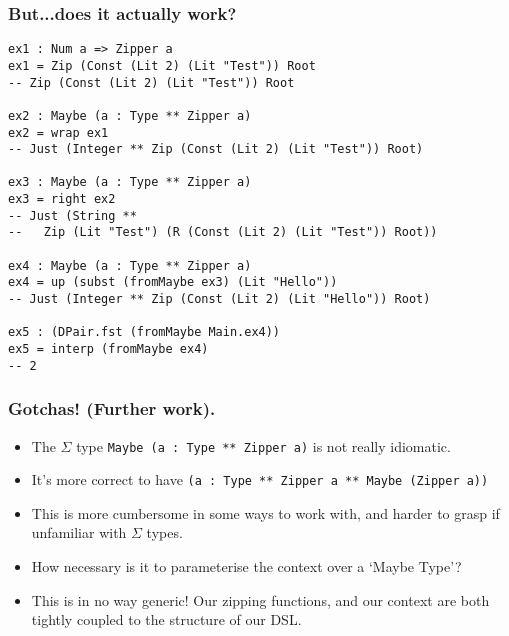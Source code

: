 \documentclass{beamer}
\begin{document}

\begin{frame}[fragile]
  \frametitle{But...does it actually work?}
  \begin{verbatim}
ex1 : Num a => Zipper a
ex1 = Zip (Const (Lit 2) (Lit "Test")) Root
-- Zip (Const (Lit 2) (Lit "Test")) Root

ex2 : Maybe (a : Type ** Zipper a)
ex2 = wrap ex1
-- Just (Integer ** Zip (Const (Lit 2) (Lit "Test")) Root)

ex3 : Maybe (a : Type ** Zipper a)
ex3 = right ex2
-- Just (String ** 
--   Zip (Lit "Test") (R (Const (Lit 2) (Lit "Test")) Root))

ex4 : Maybe (a : Type ** Zipper a)
ex4 = up (subst (fromMaybe ex3) (Lit "Hello"))
-- Just (Integer ** Zip (Const (Lit 2) (Lit "Hello")) Root)

ex5 : (DPair.fst (fromMaybe Main.ex4))
ex5 = interp (fromMaybe ex4)
-- 2
  \end{verbatim}
\end{frame}

\begin{frame}[fragile]
  \frametitle{Gotchas! (Further work).}
  \begin{itemize}
    \item The $\Sigma$ type \texttt{Maybe (a : Type ** Zipper a)}
      is not really idiomatic.
    \item It's more correct to have \texttt{(a : Type ** Zipper a
      ** Maybe (Zipper a))}
    \item This is more cumbersome in some ways to work with, and harder to
      grasp if unfamiliar with $\Sigma$ types.
    \item How necessary is it to parameterise the context over a `Maybe Type'?
    \item This is in no way generic! Our zipping functions, and our context
      are both tightly coupled to the structure of our DSL. 
  \end{itemize}
\end{frame}
\end{document}
